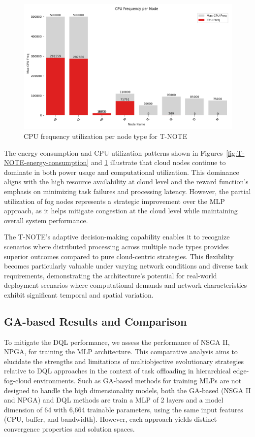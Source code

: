 \documentclass[preprint,3p,authoryear]{elsarticle}
\begin{document}
\begin{figure}[H]
    \centering
    \includegraphics[width=0.5\linewidth]{figs/T-NOTE/cpu_frequency_per_node.png}
    \caption{CPU frequency utilization per node type for T-NOTE}
    \label{fig:T-NOTE-cpu-frequency}
\end{figure}

The energy consumption and CPU utilization patterns shown in Figures~\ref{fig:T-NOTE-energy-consumption} and \ref{fig:T-NOTE-cpu-frequency} illustrate that cloud nodes continue to dominate in both power usage and computational utilization. This dominance aligns with the high resource availability at cloud level and the reward function's emphasis on minimizing task failures and processing latency. However, the partial utilization of fog nodes represents a strategic improvement over the MLP approach, as it helps mitigate congestion at the cloud level while maintaining overall system performance.

The T-NOTE's adaptive decision-making capability enables it to recognize scenarios where distributed processing across multiple node types provides superior outcomes compared to pure cloud-centric strategies. This flexibility becomes particularly valuable under varying network conditions and diverse task requirements, demonstrating the architecture's potential for real-world deployment scenarios where computational demands and network characteristics exhibit significant temporal and spatial variation.




\subsection{GA-based Results and Comparison}\label{subsec:ga_vs_DQL}

To mitigate the DQL performance, we assess the performance of NSGA II, NPGA, for training the MLP architecture. This comparative analysis aims to elucidate the strengths and limitations of multiobjective evolutionary strategies relative to DQL approaches in the context of task offloading in hierarchical edge-fog-cloud environments. Such as GA-based methods for training MLPs are not designed to handle the high dimensionality models, both the GA-based (NSGA II and NPGA) and DQL methods are train a MLP of 2 layers and a model dimension of 64 with 6,664 trainable parameters, using the same input features (CPU, buffer, and bandwidth). However, each approach yields distinct convergence properties and solution spaces.
\end{document}
